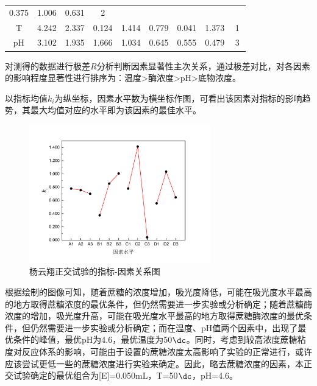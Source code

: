 \begin{enumerate}
\begin{table}[H]
\begin{tabular}{@{}clclclclclclclclcl@{}}
  \multicolumn{2}{c}{0.375} &
  \multicolumn{2}{c}{1.006} &
  \multicolumn{2}{c}{0.631} &
  \multicolumn{2}{c}{2} \\
\multicolumn{2}{c}{T} &
 \multicolumn{2}{c}{4.242} &
  \multicolumn{2}{c}{2.337} &
  \multicolumn{2}{c}{0.124} &
  \multicolumn{2}{c}{1.414} &
  \multicolumn{2}{c}{0.779} &
  \multicolumn{2}{c}{0.041} &
  \multicolumn{2}{c}{1.373} &
  \multicolumn{2}{c}{1} \\
\multicolumn{2}{c}{pH} &
 \multicolumn{2}{c}{3.102} &
  \multicolumn{2}{c}{1.935} &
  \multicolumn{2}{c}{1.666} &
  \multicolumn{2}{c}{1.034} &
  \multicolumn{2}{c}{0.645} &
  \multicolumn{2}{c}{0.555} &
  \multicolumn{2}{c}{0.479} &
  \multicolumn{2}{c}{3} \\ \bottomrule
\end{tabular}
\end{table}

对测得的数据进行极差$R$分析判断因素显著性主次关系，通过极差对比，对各因素的影响程度显著性进行排序为：温度>酶浓度>pH>底物浓度。

以指标均值$k_i$为纵坐标，因素水平数为横坐标作图，可看出该因素对指标的影响趋势，其最大均值对应的水平即为该因素的最佳水平。

\begin{figure}[H]
    \centering
    \includegraphics[width = 0.7\textwidth]{figure/Some Pictures/figure-1.png}
    \caption{杨云翔正交试验的指标-因素关系图}
    \label{fig:enter-label}
\end{figure}

根据绘制的图像可知，随着蔗糖的浓度增加，吸光度降低，可能在吸光度水平最高的地方取得蔗糖浓度的最优条件，但仍然需要进一步实验或分析确定；随着蔗糖酶浓度的增加，吸光度升高，可能在吸光度水平最高的地方取得蔗糖酶浓度的最优条件，但仍然需要进一步实验或分析确定；而在温度、pH值两个因素中，出现了最优条件的峰值，最优pH为4.6，最优温度为50$\dc$。同时，考虑到较高浓度蔗糖粘度对反应体系的影响，可能由于设置的蔗糖浓度太高影响了实验的正常进行，或许应该尝试更低一些的蔗糖浓度进行实验来确定。因此，略去蔗糖浓度的因素，本正交试验确定的最优组合为[E]=0.050mL，T=50$\dc$，pH=4.6。


\end{enumerate}
